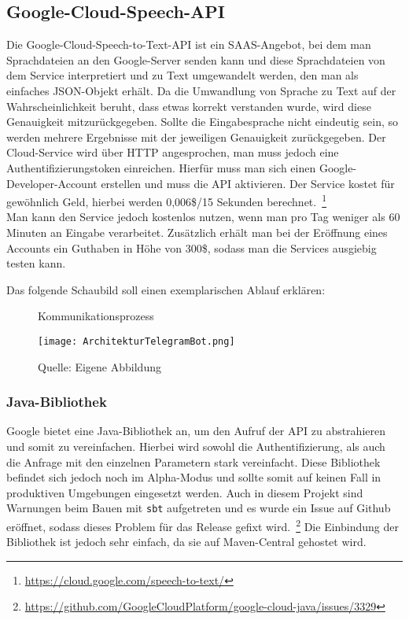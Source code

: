 \subsection{Google-Cloud-Speech-API}
Die Google-Cloud-Speech-to-Text-API ist ein SAAS-Angebot, bei dem man Sprachdateien an den Google-Server senden kann und diese Sprachdateien von dem Service interpretiert und zu Text umgewandelt werden, den man als einfaches JSON-Objekt erhält. Da die Umwandlung von Sprache zu Text auf der Wahrscheinlichkeit beruht, dass etwas korrekt verstanden wurde, wird diese Genauigkeit mitzurückgegeben. Sollte die Eingabesprache nicht eindeutig sein, so werden mehrere Ergebnisse mit der jeweiligen Genauigkeit zurückgegeben.
Der Cloud-Service wird über HTTP angesprochen, man muss jedoch eine Authentifizierungstoken einreichen. Hierfür muss man sich einen Google-Developer-Account erstellen und muss die API aktivieren. Der Service kostet für gewöhnlich Geld, hierbei werden 0,006\$/15 Sekunden berechnet.~\footnote{\url{https://cloud.google.com/speech-to-text/}} \\
Man kann den Service jedoch kostenlos nutzen, wenn man pro Tag weniger als 60 Minuten an Eingabe verarbeitet. Zusätzlich erhält man bei der Eröffnung eines Accounts ein Guthaben in Höhe von 300\$, sodass man die Services ausgiebig testen kann.

Das folgende Schaubild soll einen exemplarischen Ablauf erklären:
\begin{figure}[H]
    \centering
    \caption{Kommunikationsprozess}
      \texttt{[image: ArchitekturTelegramBot.png]}
      \label{img:architektur}
    \caption*{Quelle: Eigene Abbildung}
\end{figure}

\subsubsection{Java-Bibliothek}
Google bietet eine Java-Bibliothek an, um den Aufruf der API zu abstrahieren und somit zu vereinfachen. Hierbei wird sowohl die Authentifizierung, als auch die Anfrage mit den einzelnen Parametern stark vereinfacht. Diese Bibliothek befindet sich jedoch noch im Alpha-Modus und sollte somit auf keinen Fall in produktiven Umgebungen eingesetzt werden. Auch in diesem Projekt sind Warnungen beim Bauen mit \texttt{sbt} aufgetreten und es wurde ein Issue auf Github eröffnet, sodass dieses Problem für das Release gefixt wird.~\footnote{\url{https://github.com/GoogleCloudPlatform/google-cloud-java/issues/3329}} 
Die Einbindung der Bibliothek ist jedoch sehr einfach, da sie auf Maven-Central gehostet wird.

